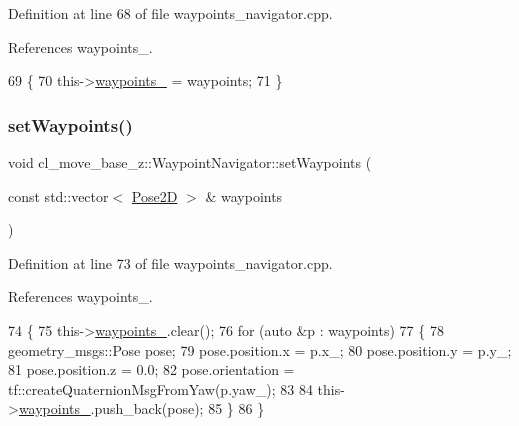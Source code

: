 Definition at line 68 of file waypoints\+\_\+navigator.\+cpp.



References waypoints\+\_\+.


\begin{DoxyCode}
69 \{
70   this->\hyperlink{classcl__move__base__z_1_1WaypointNavigator_a727f6a73e15ff5dc6bb3ffdf52c3d832}{waypoints\_} = waypoints;
71 \}
\end{DoxyCode}
\mbox{\label{classcl__move__base__z_1_1WaypointNavigator_aa164ff2510b9549b0b73df6eb18a7a4f}} 
\subsubsection{\texorpdfstring{set\+Waypoints()}{setWaypoints()}\hspace{0.1cm}{\footnotesize\ttfamily [2/2]}}
{\footnotesize\ttfamily void cl\+\_\+move\+\_\+base\+\_\+z\+::\+Waypoint\+Navigator\+::set\+Waypoints (\begin{DoxyParamCaption}\item[{const std\+::vector$<$ \hyperlink{structcl__move__base__z_1_1Pose2D}{Pose2D} $>$ \&}]{waypoints }\end{DoxyParamCaption})}



Definition at line 73 of file waypoints\+\_\+navigator.\+cpp.



References waypoints\+\_\+.


\begin{DoxyCode}
74 \{
75   this->\hyperlink{classcl__move__base__z_1_1WaypointNavigator_a727f6a73e15ff5dc6bb3ffdf52c3d832}{waypoints\_}.clear();
76   \textcolor{keywordflow}{for} (\textcolor{keyword}{auto} &p : waypoints)
77   \{
78     geometry\_msgs::Pose pose;
79     pose.position.x = p.x\_;
80     pose.position.y = p.y\_;
81     pose.position.z = 0.0;
82     pose.orientation = tf::createQuaternionMsgFromYaw(p.yaw\_);
83 
84     this->\hyperlink{classcl__move__base__z_1_1WaypointNavigator_a727f6a73e15ff5dc6bb3ffdf52c3d832}{waypoints\_}.push\_back(pose);
85   \}
86 \}
\end{DoxyCode}


